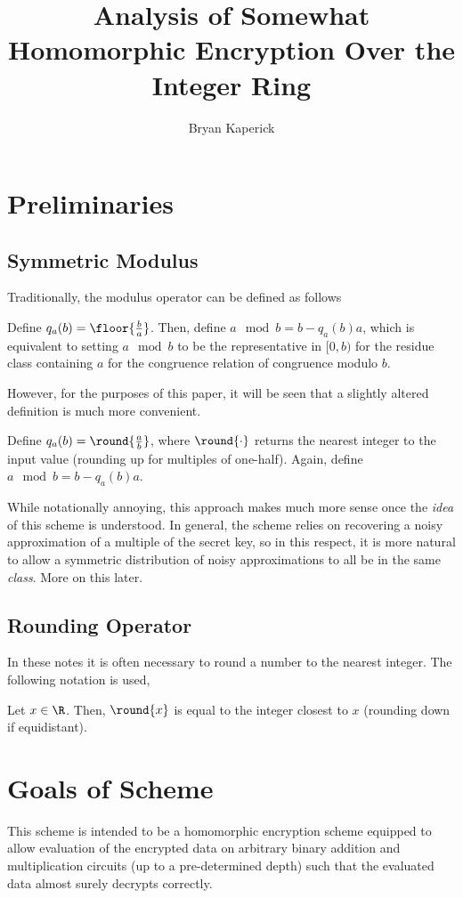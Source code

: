 \documentclass[a4paper,11pt, oneside]{article}
\title{Analysis of Somewhat Homomorphic Encryption Over the Integer Ring}
\author{Bryan Kaperick}
\begin{document}
\maketitle\newpage
\section{Preliminaries}
\subsection{Symmetric Modulus}
Traditionally, the modulus operator can be defined as follows
\begin{definition}
  Define $q_a(b) = \floor{\frac{b}{a}}$.  Then, define $a\mod{b} = b - q_a(b)a$, which is equivalent to setting $a\mod{b}$ to be the representative in $[0,b)$ for the residue class containing $a$ for the congruence relation of congruence modulo $b$.
\end{definition}

However, for the purposes of this paper, it will be seen that a slightly altered definition is much more convenient.
\begin{definition}
  Define $q_a(b) = \round{\frac{a}{b}}$, where $\round{\cdot}$ returns the nearest integer to the input value (rounding up for multiples of one-half).  Again, define $a\mod{b} = b - q_a(b)a$.
\end{definition}

While notationally annoying, this approach makes much more sense once the \emph{idea} of this scheme is understood.  In general, the scheme relies on recovering a noisy approximation of a multiple of the secret key, so in this respect, it is more natural to allow a symmetric distribution of noisy approximations to all be in the same \emph{class}.  More on this later.

\subsection{Rounding Operator}

In these notes it is often necessary to round a number to the nearest integer.  The following notation is used,
\begin{definition}
  Let $x\in\R$.  Then, $\round{x}$ is equal to the integer closest to $x$ (rounding down if equidistant).
\end{definition}

\section{Goals of Scheme}
This scheme is intended to be a homomorphic encryption scheme equipped to allow evaluation of the encrypted data on arbitrary binary addition and multiplication circuits (up to a pre-determined depth) such that the evaluated data almost surely decrypts correctly.  
\end{document}
